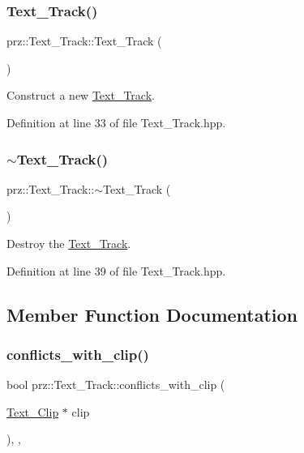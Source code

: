 \subsubsection{\texorpdfstring{Text\_Track()}{Text\_Track()}}
{\footnotesize\ttfamily prz\+::\+Text\+\_\+\+Track\+::\+Text\+\_\+\+Track (\begin{DoxyParamCaption}{ }\end{DoxyParamCaption})\hspace{0.3cm}{\ttfamily [inline]}}



Construct a new \mbox{\hyperlink{classprz_1_1_text___track}{Text\+\_\+\+Track}}. 



Definition at line 33 of file Text\+\_\+\+Track.\+hpp.

\mbox{\label{classprz_1_1_text___track_afc271eaf47473488c65986d56c9bdc51}} 
\subsubsection{\texorpdfstring{$\sim$Text\_Track()}{~Text\_Track()}}
{\footnotesize\ttfamily prz\+::\+Text\+\_\+\+Track\+::$\sim$\+Text\+\_\+\+Track (\begin{DoxyParamCaption}{ }\end{DoxyParamCaption})\hspace{0.3cm}{\ttfamily [inline]}}



Destroy the \mbox{\hyperlink{classprz_1_1_text___track}{Text\+\_\+\+Track}}. 



Definition at line 39 of file Text\+\_\+\+Track.\+hpp.



\subsection{Member Function Documentation}
\mbox{\label{classprz_1_1_text___track_af19070ff05eb7922539baa043441145c}} 
\subsubsection{\texorpdfstring{conflicts\_with\_clip()}{conflicts\_with\_clip()}}
{\footnotesize\ttfamily bool prz\+::\+Text\+\_\+\+Track\+::conflicts\+\_\+with\+\_\+clip (\begin{DoxyParamCaption}\item[{\mbox{\hyperlink{classprz_1_1_text___clip}{Text\+\_\+\+Clip}} $\ast$}]{clip }\end{DoxyParamCaption})\hspace{0.3cm}{\ttfamily [final]}, {\ttfamily [override]}, {\ttfamily [virtual]}}



